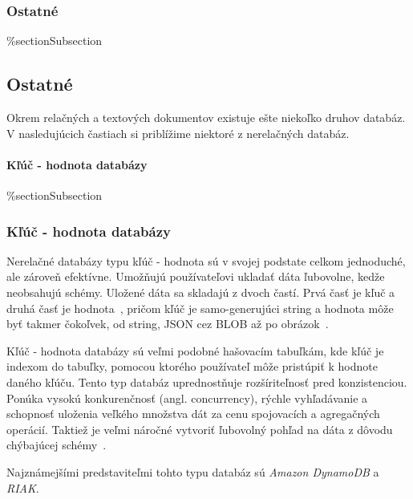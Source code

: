 %
%
{
	\subsubsection{Ostatné}
}
{
	\%section{Subsection}
	\subsection{Ostatné}
}
\label{subsection:types_of_norelation_dbs}
Okrem relačných a textových dokumentov existuje ešte niekoľko druhov databáz. V nasledujúcich častiach si priblížime niektoré z nerelačných databáz.

%
%
{
	\paragraph{Kľúč - hodnota databázy}
}
{
	\%section{Subsection}
	\subsubsection{Kľúč - hodnota databázy}
}
\label{subsubsection:key_value_db}
Nerelačné databázy typu kľúč - hodnota sú v svojej podstate celkom jednoduché, ale zároveň efektívne. Umožňujú používateľovi ukladať dáta ľubovolne, kedže neobsahujú schémy. Uložené dáta sa skladajú z dvoch častí. Prvá časť je kľuč a druhá časť je hodnota~\cite{NoSQLDBvsRealtionDB}, pričom kľúč je samo-generujúci string a hodnota môže byť takmer čokoľvek, od string, JSON cez BLOB až po obrázok~\cite{MongoDBvsMySQL2015}.

Kľúč - hodnota databázy sú veľmi podobné hašovacím tabuľkám, kde kľúč je indexom do tabuľky, pomocou ktorého používateľ môže pristúpiť k hodnote daného kľúču. Tento typ databáz uprednostňuje rozšíriteľnosť pred konzistenciou. Ponúka vysokú konkurenčnosť (angl. concurrency), rýchle vyhľadávanie a schopnosť uloženia veľkého množstva dát za cenu spojovacích a agregačných operácií. Taktiež je veľmi náročné vytvoriť ľubovolný pohľad na dáta z dôvodu chýbajúcej schémy~\cite{NoSQLDBvsRealtionDB}.

Najznámejšími predstaviteľmi tohto typu databáz sú \textit{Amazon DynamoDB} a \textit{RIAK}.

